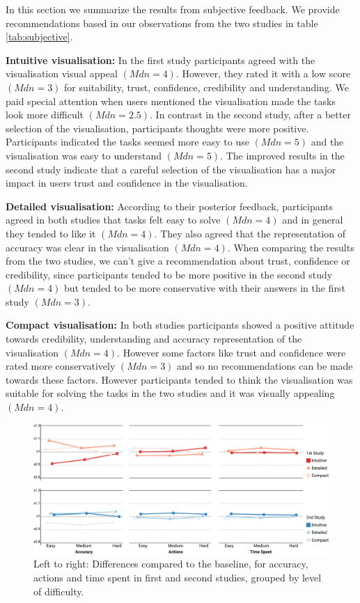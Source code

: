 \documentclass[final,5p,times,twocolumn,authoryear]{elsarticle}
\begin{document}
In this section we summarize the results from subjective feedback. We provide recommendations based in our observations from the two studies in table \ref{tab:subjective}. 

\textbf{Intuitive visualisation:} In the first study participants agreed with the visualisation visual appeal $(Mdn = 4)$. However, they rated it with a low score $(Mdn = 3)$ for suitability, trust, confidence, credibility and understanding. We paid special attention when users mentioned the visualisation made the tasks look more difficult $(Mdn = 2.5)$. In contrast in the second study, after a better selection of the  visualisation, participants thoughts were more positive. Participants indicated the tasks seemed more easy to use $(Mdn = 5)$ and the visualisation was easy to understand $(Mdn = 5)$. The improved results in the second study indicate that a careful selection of the visualisation has a major impact in users trust and confidence in the visualisation.

\textbf{Detailed visualisation:} According to their posterior feedback, participants agreed in both studies that tasks felt easy to solve $(Mdn = 4)$ and in general they tended to like it $(Mdn = 4)$. They also agreed that the representation of accuracy was clear in the visualisation $(Mdn = 4)$. When comparing the results from the two studies, we can't give a recommendation about trust, confidence or credibility, since participants tended to be more positive in the second study $(Mdn = 4)$ but tended to be more conservative with their answers in the first study $(Mdn = 3)$. 

\textbf{Compact visualisation:} In both studies participants showed a positive attitude towards credibility, understanding and accuracy representation of the visualisation $(Mdn = 4)$. However some factors like trust and confidence were rated more conservatively $(Mdn = 3)$ and so no recommendations can be made towards these factors. However participants tended to think the visualisation was suitable for solving the tasks in the two studies and it was visually appealing $(Mdn = 4)$. 

\begin{figure}[t]
\includegraphics[width=\textwidth]{figures/question2.png}
\caption{Left to right: Differences compared to the baseline, for accuracy, actions and time spent in first and second studies, grouped by level of difficulty.}
\label{question2}
\end{figure} 
\end{document}
